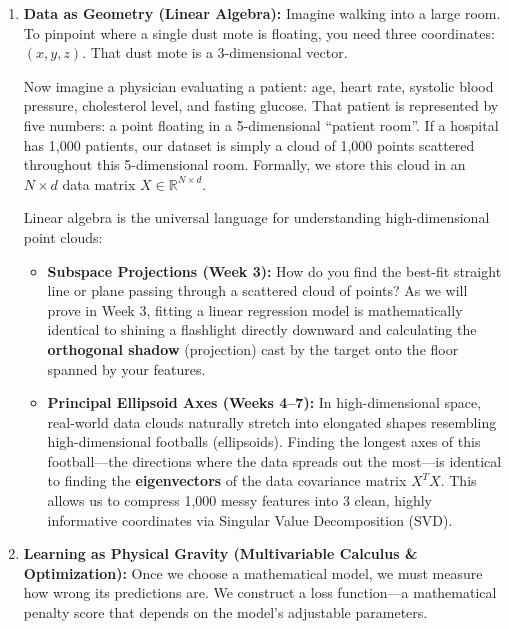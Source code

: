 \begin{enumerate}
    \item \textbf{Data as Geometry (Linear Algebra):}
    Imagine walking into a large room. To pinpoint where a single dust mote is floating, you need three coordinates: $(x, y, z)$. That dust mote is a 3-dimensional vector.
    
    Now imagine a physician evaluating a patient: age, heart rate, systolic blood pressure, cholesterol level, and fasting glucose. That patient is represented by five numbers: a point floating in a 5-dimensional ``patient room''. If a hospital has 1,000 patients, our dataset is simply a cloud of 1,000 points scattered throughout this 5-dimensional room. Formally, we store this cloud in an $N \times d$ data matrix $X \in \mathbb{R}^{N \times d}$.
    
    Linear algebra is the universal language for understanding high-dimensional point clouds:
    \begin{itemize}
        \item \textbf{Subspace Projections (Week 3):} How do you find the best-fit straight line or plane passing through a scattered cloud of points? As we will prove in Week 3, fitting a linear regression model is mathematically identical to shining a flashlight directly downward and calculating the \textbf{orthogonal shadow} (projection) cast by the target onto the floor spanned by your features.
        \item \textbf{Principal Ellipsoid Axes (Weeks 4--7):} In high-dimensional space, real-world data clouds naturally stretch into elongated shapes resembling high-dimensional footballs (ellipsoids). Finding the longest axes of this football—the directions where the data spreads out the most—is identical to finding the \textbf{eigenvectors} of the data covariance matrix $X^T X$. This allows us to compress 1,000 messy features into 3 clean, highly informative coordinates via Singular Value Decomposition (SVD).
    \end{itemize}

    \item \textbf{Learning as Physical Gravity (Multivariable Calculus \& Optimization):}
    Once we choose a mathematical model, we must measure how wrong its predictions are. We construct a loss function—a mathematical penalty score that depends on the model's adjustable parameters.
    

\end{enumerate}
